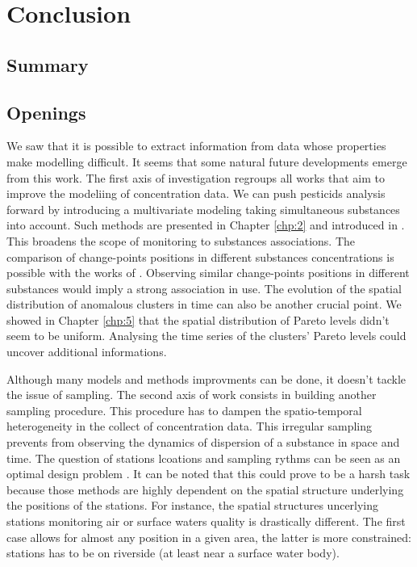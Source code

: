 

\chapter{Conclusion}

\section{Summary}

\section{Openings}

We saw that it is possible to extract information from data whose properties make modelling difficult. It seems that some natural future developments emerge from this work. 
The first axis of investigation regroups all works that aim to improve the modeliing of concentration data. We can push pesticids analysis forward by introducing a multivariate modeling taking simultaneous substances into account. Such methods are presented in Chapter \ref{chp:2} and introduced in \cite{pickering2016changepoint}. This broadens the scope of monitoring to substances associations. The comparison of change-points positions in different substances concentrations is possible with the works of \cite{Cleynen2014}. Observing similar change-points positions in different substances would imply a strong association in use. The evolution of the spatial distribution of anomalous clusters in time can also be another crucial point. We showed in Chapter \ref{chp:5} that the spatial distribution of Pareto levels didn't seem to be uniform. Analysing the time series of the clusters' Pareto levels could uncover additional informations.  
 
Although many models and methods improvments can be done, it doesn't tackle the issue of sampling. The second axis of work consists in building another sampling procedure. This procedure has to dampen the spatio-temporal heterogeneity in the collect of concentration data. This irregular sampling prevents from observing the dynamics of dispersion of a substance in space and time. The question of stations lcoations and sampling rythms can be seen as an optimal design problem \cite{Mueller2011,Marsh2012}. It can be noted that this could prove to be a harsh task because those methods are highly dependent on the spatial structure underlying the positions of the stations. For instance, the spatial structures uncerlying stations monitoring air or surface waters quality is drastically different. The first case allows for almost any position in a given area, the latter is more constrained: stations has to be on riverside (at least near a surface water body).  
